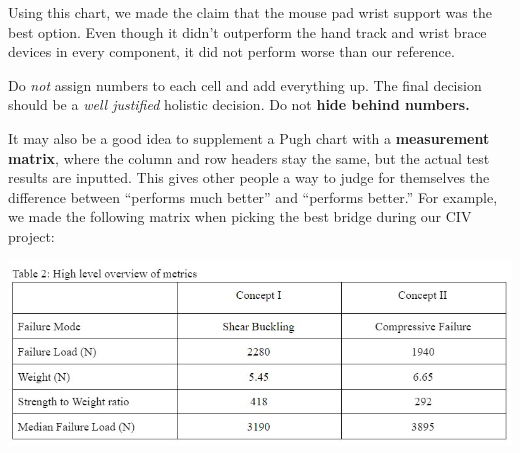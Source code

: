 \documentclass{beamer}
\begin{document}
{Using this chart, we made the claim that the mouse pad wrist support was the best option. Even though it didn't outperform the hand track and wrist brace devices in every component, it did not perform worse than our reference.
\begin{warning}
    Do \textit{not} assign numbers to each cell and add everything up. The final decision should be a \textit{well justified} holistic decision. Do not \textbf{hide behind numbers.}
\end{warning}
\begin{takeaway}
    It may also be a good idea to supplement a Pugh chart with a \textbf{measurement matrix}, where the column and row headers stay the same, but the actual test results are inputted. This gives other people a way to judge for themselves the difference between ``performs much better'' and ``performs better.'' For example, we made the following matrix when picking the best bridge during our CIV project:
    \begin{center}
        \includegraphics[width=0.9\linewidth]{handbook/measurement matrix.jpg}
    \end{center}
\end{takeaway}
}
\end{document}

